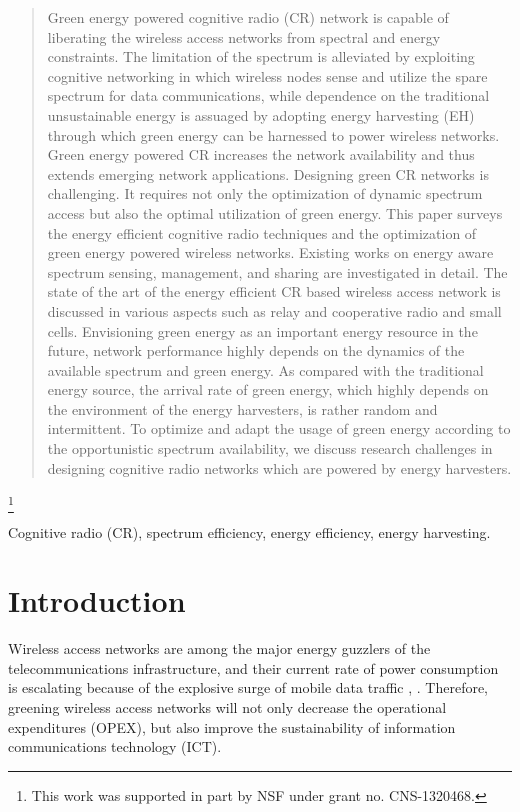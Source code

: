 \documentclass[journal,12pt,onecolumn]{IEEEtran}
\newcommand\blfootnote[1]{\begingroup
  \renewcommand\thefootnote{}\footnote{#1}\addtocounter{footnote}{-1}\endgroup
}
\begin{document}
\begin{abstract}
Green energy powered cognitive radio (CR) network is capable of liberating the wireless access networks from spectral and energy constraints. The limitation of the spectrum is alleviated by exploiting cognitive networking in which wireless nodes sense and utilize the spare spectrum for data communications, while dependence on the traditional unsustainable energy is assuaged by adopting energy harvesting (EH) through which green energy can be harnessed to power wireless networks. Green energy powered CR increases the network availability and thus extends emerging network applications. Designing green CR networks is challenging. It requires not only the optimization of dynamic spectrum access but also the optimal utilization of green energy. This paper surveys the energy efficient cognitive radio techniques and the optimization of green energy powered wireless networks. Existing works on energy aware spectrum sensing, management, and sharing are investigated in detail. The state of the art of the energy efficient CR based wireless access network is discussed in various aspects such as relay and cooperative radio and small cells. Envisioning green energy as an important energy resource in the future, network performance highly depends on the dynamics of the available spectrum and green energy. As compared with the traditional energy source, the arrival rate of green energy, which highly depends on the environment of the energy harvesters, is rather random and intermittent. To optimize and adapt the usage of green energy according to the opportunistic spectrum availability, we discuss research challenges in designing cognitive radio networks which are powered by energy harvesters.
\end{abstract}
\blfootnote{This work was supported in part by NSF under grant no. CNS-1320468.}
\begin{IEEEkeywords}
Cognitive radio (CR), spectrum efficiency, energy efficiency, energy harvesting.
\end{IEEEkeywords}


\section{Introduction}
Wireless access networks are among the major energy guzzlers of the telecommunications infrastructure, and their current rate of power consumption is escalating because of the explosive surge of mobile data traffic \cite{6472203}, \cite{DeDomenico20145}. Therefore, greening wireless access networks will not only decrease the operational expenditures (OPEX), but also improve the sustainability of information communications technology (ICT).
\end{document}
